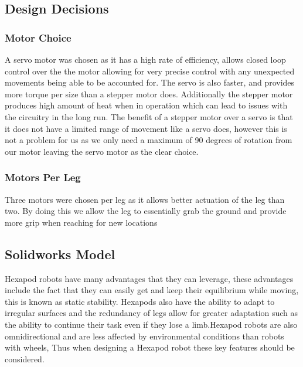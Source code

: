  




\subsection{Design Decisions}
\subsubsection{Motor Choice}
A servo motor was chosen as it has a high rate of efficiency, allows closed loop control over the the motor allowing for very precise control with any unexpected movements being able to be accounted for. The servo is also faster, and provides more torque per size than a stepper motor does. Additionally the stepper motor produces  high amount of heat when in operation which can lead to issues with the circuitry in the long run. The benefit of a stepper motor over a servo is that it does not have a limited range of movement like a servo does, however this is not a problem for us as we only need a maximum of 90 degrees of rotation from our motor leaving the servo motor as the clear choice.

\subsubsection{Motors Per Leg}
Three motors were chosen per leg as it allows better actuation of the leg than two. By doing this we allow the leg to essentially grab the ground and provide more grip when reaching for new locations

\subsection{Solidworks Model}

Hexapod robots have many advantages that they can leverage, these advantages include the fact that they can easily get and keep their equilibrium while moving, this is known as static stability. Hexapods also have the ability to adapt to irregular surfaces and the redundancy of legs allow for greater adaptation such as the ability to continue their task even if they lose a limb.Hexapod robots are also omnidirectional and are less affected by environmental conditions than robots with wheels, \cite{pullteap2013development} Thus when designing a Hexapod robot these key features should be considered. 


